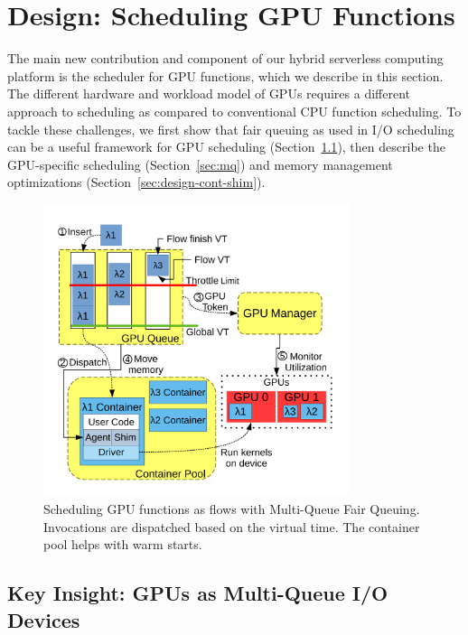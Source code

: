 \section{Design: Scheduling GPU Functions}
\label{sec:design}

The main new contribution and component of our hybrid serverless computing platform is the scheduler for GPU functions, which we describe in this section. 
The different hardware and workload model of GPUs requires a different approach to scheduling as compared to conventional CPU function scheduling. 
To tackle these challenges, we first show that fair queuing as used in I/O scheduling can be a useful framework for GPU scheduling (Section~\ref{sec:d:mqfq}), then describe the GPU-specific scheduling (Section~\ref{sec:mq}) and memory management optimizations (Section~\ref{sec:design-cont-shim}). 

\begin{figure}
  \centering
  \includegraphics[width=0.8\textwidth]{./mqfq-final/figs/queue-sys-2-simple.pdf}
  \caption{Scheduling GPU functions as flows with Multi-Queue Fair Queuing. Invocations are dispatched based on the virtual time. The container pool helps with warm starts.}
  \label{fig:sys-diag}
\end{figure}


\subsection{Key Insight: GPUs as Multi-Queue I/O Devices}
\label{sec:d:mqfq}

